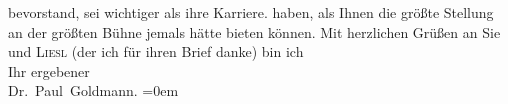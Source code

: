 \begin{ledgroupsized}[t]{13cm}
{{{                  bevorstand, sei wichtiger als ihre Karriere.}}}\label{K_L03532-6h} haben, als Ihnen die größte
               Stellung an der größten Bühne jemals hätte bieten können.\pend
           \pstart
           Mit herzlichen Grüßen an Sie und \textsc{Liesl} (der ich für ihren Brief danke) bin ich {\\[\baselineskip]}Ihr ergebener {\\[\baselineskip]}\spacefill\mbox{Dr. Paul Goldmann.}\pend
           \leftskip=0em{}
         
         \endnumbering{}\end{ledgroupsized}  \newcommand{\dateiname}{L03532}\newcommand{\titel}{Paul Goldmann an Olga Gussmann, 9. 7. [1902?]}\newcommand{\editorInnen}{Martin Anton Müller und Laura Untner}
      